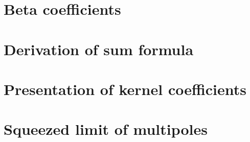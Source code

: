 \begin{appendices}

\chapter{Beta coefficients}
\label{app_betas}



\chapter{Derivation of sum formula}
\label{app_sum}



\chapter{Presentation of kernel coefficients}
\label{app_kernelpres}



\chapter{Squeezed limit of multipoles}
\label{app_sqlimmultip}



\end{appendices}
